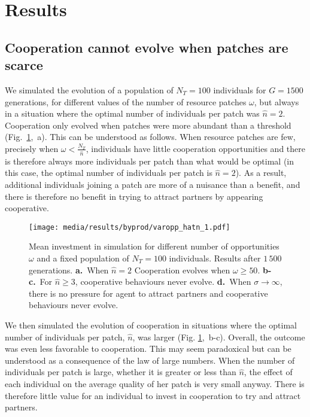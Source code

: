 \documentclass[twocolumn]{article}
\begin{document}
\section{Results}

\subsection{Cooperation cannot evolve when patches are scarce}

We simulated the evolution of a population of $N_T=100$ individuals for $G=1500$ generations, for different values of the number of resource patches $\omega$, but always in a situation where the optimal number of individuals per patch was $\hat{n}=2$. Cooperation only evolved when patches were more abundant than a threshold (Fig.~\ref{fig:varyingopp}, a). This can be understood as follows. When resource patches are few, precisely when $\omega < \frac{N_T}{\hat{n}}$, individuals have little cooperation opportunities and there is therefore always more individuals per patch than what would be optimal (in this case, the optimal number of individuals per patch is $\hat{n}=2$). As a result, additional individuals joining a patch are more of a nuisance than a benefit, and there is therefore no benefit in trying to attract partners by appearing cooperative.

\begin{figure}[tb]
    \centering
    \texttt{[image: media/results/byprod/varopp\_hatn\_1.pdf]}
    \caption{Mean investment in simulation for different number of opportunities $\omega$ and a fixed population of $N_T=100$ individuals. Results after $1\,500$ generations. \textbf{a.}~When $\hat{n} = 2$ Cooperation evolves when $\omega \geq 50$. \textbf{b-c.}~For $\hat{n} \geq 3$, cooperative behaviours never evolve. \textbf{d.}~When $\sigma \to \infty$, there is no pressure for agent to attract partners and cooperative behaviours never evolve.}

    \label{fig:varyingopp}
\end{figure}


We then simulated the evolution of cooperation in situations where the optimal number of individuals per patch, $\hat{n}$, was larger (Fig. \ref{fig:varyingopp}, b-c). Overall, the outcome was even less favorable to cooperation. This may seem paradoxical but can be understood as a consequence of the law of large numbers. When the number of individuals per patch is large, whether it is greater or less than $\hat{n}$, the effect of each individual on the average quality of her patch is very small anyway. There is therefore little value for an individual to invest in cooperation to try and attract partners.
\end{document}

